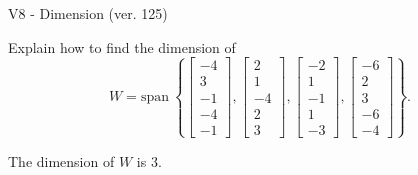\begin{exercise}
  \begin{exerciseTitle}V8 - Dimension (ver. 125)\end{exerciseTitle}
  \begin{exerciseStatement}
    Explain how to find the dimension of 
\[W=\mathrm{span}\ \left\{\left[\begin{array}{r}
-4 \\
3 \\
-1 \\
-4 \\
-1
\end{array}\right] , \left[\begin{array}{r}
2 \\
1 \\
-4 \\
2 \\
3
\end{array}\right] , \left[\begin{array}{r}
-2 \\
1 \\
-1 \\
1 \\
-3
\end{array}\right] , \left[\begin{array}{r}
-6 \\
2 \\
3 \\
-6 \\
-4
\end{array}\right]\right\}.\]



  \end{exerciseStatement}
  \begin{exerciseAnswer}
   The dimension of \(W\) is  \(3\).
  


  \end{exerciseAnswer}
\end{exercise}